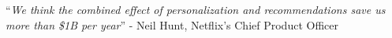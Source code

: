\documentclass[
11pt, %
oneside, %
english, %
singlespacing, %
headsepline, %
]{MastersDoctoralThesis} %
\begin{document}

\thispagestyle{plain}


\clearpage


%


\vspace*{0.2\textheight}

\noindent\Large{\enquote{\itshape We think the combined effect of personalization
and recommendations save us more than \$1B per year}}\bigbreak
\hfill \large{- Neil Hunt, Netflix's Chief Product Officer}
\normalsize


\thispagestyle{plain}


\setcounter{tocdepth}{1}
\tableofcontents %
\clearpage





\printglossaries

\end{document}
